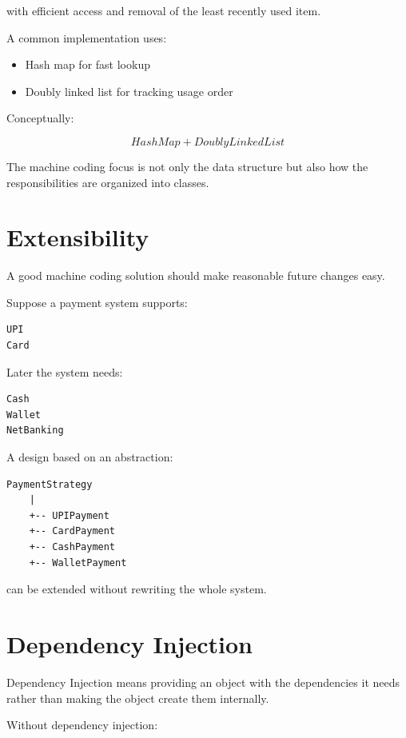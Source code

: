 \documentclass[12pt,a4paper]{article}
\begin{document}
with efficient access and removal of the least recently used item.

A common implementation uses:

\begin{itemize}
\item Hash map for fast lookup
\item Doubly linked list for tracking usage order
\end{itemize}

Conceptually:

\[
HashMap + DoublyLinkedList
\]

The machine coding focus is not only the data structure but also how the responsibilities are organized into classes.

\section{Extensibility}

A good machine coding solution should make reasonable future changes easy.

Suppose a payment system supports:

\begin{verbatim}
UPI
Card
\end{verbatim}

Later the system needs:

\begin{verbatim}
Cash
Wallet
NetBanking
\end{verbatim}

A design based on an abstraction:

\begin{verbatim}
PaymentStrategy
    |
    +-- UPIPayment
    +-- CardPayment
    +-- CashPayment
    +-- WalletPayment
\end{verbatim}

can be extended without rewriting the whole system.

\section{Dependency Injection}

Dependency Injection means providing an object with the dependencies it needs rather than making the object create them internally.

Without dependency injection:
\end{document}
